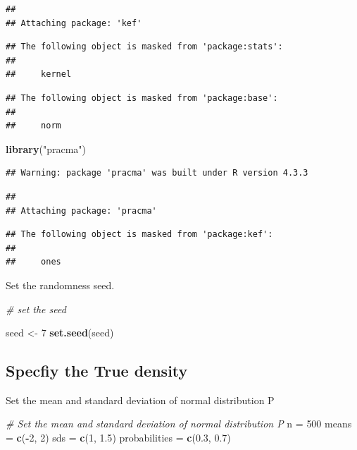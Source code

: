 \documentclass[
]{article}
\newenvironment{Shaded}{\begin{snugshade}}{\end{snugshade}}
\newcommand{\CommentTok}[1]{\textcolor[rgb]{0.56,0.35,0.01}{\textit{#1}}}
\newcommand{\DecValTok}[1]{\textcolor[rgb]{0.00,0.00,0.81}{#1}}
\newcommand{\FloatTok}[1]{\textcolor[rgb]{0.00,0.00,0.81}{#1}}
\newcommand{\FunctionTok}[1]{\textcolor[rgb]{0.13,0.29,0.53}{\textbf{#1}}}
\newcommand{\NormalTok}[1]{#1}
\newcommand{\OtherTok}[1]{\textcolor[rgb]{0.56,0.35,0.01}{#1}}
\newcommand{\SpecialCharTok}[1]{\textcolor[rgb]{0.81,0.36,0.00}{\textbf{#1}}}
\newcommand{\StringTok}[1]{\textcolor[rgb]{0.31,0.60,0.02}{#1}}
\begin{document}
\begin{verbatim}
## 
## Attaching package: 'kef'
\end{verbatim}

\begin{verbatim}
## The following object is masked from 'package:stats':
## 
##     kernel
\end{verbatim}

\begin{verbatim}
## The following object is masked from 'package:base':
## 
##     norm
\end{verbatim}

\begin{Shaded}
\begin{Highlighting}[]
\FunctionTok{library}\NormalTok{(}\StringTok{"pracma"}\NormalTok{)}
\end{Highlighting}
\end{Shaded}

\begin{verbatim}
## Warning: package 'pracma' was built under R version 4.3.3
\end{verbatim}

\begin{verbatim}
## 
## Attaching package: 'pracma'
\end{verbatim}

\begin{verbatim}
## The following object is masked from 'package:kef':
## 
##     ones
\end{verbatim}

Set the randomness seed.

\begin{Shaded}
\begin{Highlighting}[]
\CommentTok{\# set the seed}

\NormalTok{seed }\OtherTok{\textless{}{-}} \DecValTok{7}
\FunctionTok{set.seed}\NormalTok{(seed)}
\end{Highlighting}
\end{Shaded}

\subsection{Specfiy the True density}\label{specfiy-the-true-density}

Set the mean and standard deviation of normal distribution P

\begin{Shaded}
\begin{Highlighting}[]
\CommentTok{\# Set the mean and standard deviation of normal distribution P}
\NormalTok{ n }\OtherTok{=} \DecValTok{500}
\NormalTok{ means }\OtherTok{=} \FunctionTok{c}\NormalTok{(}\SpecialCharTok{{-}}\DecValTok{2}\NormalTok{, }\DecValTok{2}\NormalTok{)}
\NormalTok{ sds }\OtherTok{=} \FunctionTok{c}\NormalTok{(}\DecValTok{1}\NormalTok{, }\FloatTok{1.5}\NormalTok{)}
\NormalTok{ probabilities }\OtherTok{=} \FunctionTok{c}\NormalTok{(}\FloatTok{0.3}\NormalTok{, }\FloatTok{0.7}\NormalTok{)}
\end{Highlighting}
\end{Shaded}
\end{document}

